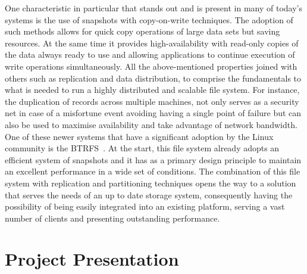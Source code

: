 One characteristic in particular that stands out and is present in many of today's systems is the use of snapshots with copy-on-write techniques. The adoption of such methods allows for quick copy operations of large data sets but saving resources. At the same time it provides high-availability with read-only copies of the data always ready to use and allowing applications to continue execution of write operations simultaneously.
All the above-mentioned properties joined with others such as replication and data distribution, to comprise the fundamentals to what is needed to run a highly distributed and scalable file system. For instance, the duplication of records across multiple machines, not only serves as a security net in case of a misfortune event avoiding having a single point of failure but can also be used to maximise availability and take advantage of network bandwidth. 
\\
%



One of these newer systems that have a significant adoption by the Linux community is the BTRFS~\cite{Rodeh2013}. At the start, this file system already adopts an efficient system of snapshots and it has as a primary design principle to maintain an excellent performance in a wide set of conditions.
The combination of this file system with replication and partitioning techniques opens the way to a solution that serves the needs of an up to date storage system, consequently having the possibility of being easily integrated into an existing platform, serving a vast number of clients and presenting outstanding performance. 





\section{Project Presentation} %
\label{sec:project_presentation}

